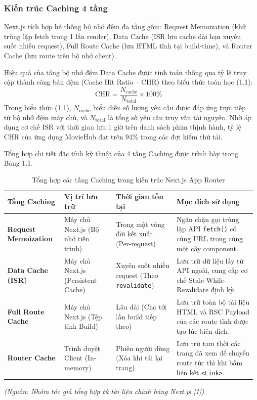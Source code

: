 \documentclass[13pt,a4paper]{extarticle}
\begin{document}
\subsubsection{Kiến trúc Caching 4 tầng}
Next.js tích hợp hệ thống bộ nhớ đệm đa tầng gồm: Request Memoization (khử trùng lặp fetch trong 1 lần render), Data Cache (ISR lưu cache dài hạn xuyên suốt nhiều request), Full Route Cache (lưu HTML tĩnh tại build-time), và Router Cache (lưu route trên bộ nhớ client).

Hiệu quả của tầng bộ nhớ đệm Data Cache được tính toán thông qua tỷ lệ truy cập thành công bản đệm (Cache Hit Ratio -- CHR) theo biểu thức toán học (1.1):
\begin{equation}
\text{CHR} = \frac{N_{\text{cache}}}{N_{\text{total}}} \times 100\%
\label{eq:chr}
\end{equation}
Trong biểu thức (1.1), $N_{\text{cache}}$ biểu diễn số lượng yêu cầu được đáp ứng trực tiếp từ bộ nhớ đệm máy chủ, và $N_{\text{total}}$ là tổng số yêu cầu truy vấn tài nguyên. Nhờ áp dụng cơ chế ISR với thời gian lưu 1 giờ trên danh sách phim thịnh hành, tỷ lệ CHR của ứng dụng MovieHub đạt trên 94\% trong các đợt kiểm thử tải.

Tổng hợp chi tiết đặc tính kỹ thuật của 4 tầng Caching được trình bày trong Bảng 1.1.

\begin{table}[H]
\centering
\caption{Tổng hợp các tầng Caching trong kiến trúc Next.js App Router}
\label{tab:caching}
\begin{tabularx}{\textwidth}{>{\raggedright\arraybackslash}p{3.2cm}>{\raggedright\arraybackslash}p{3cm}>{\raggedright\arraybackslash}p{3cm}>{\raggedright\arraybackslash}X}
\toprule
\textbf{Tầng Caching} & \textbf{Vị trí lưu trữ} & \textbf{Thời gian tồn tại} & \textbf{Mục đích sử dụng} \\
\midrule
\textbf{Request Memoization} & Máy chủ Next.js (Bộ nhớ tiến trình) & Trong một vòng đời kết xuất (Per-request) & Ngăn chặn gọi trùng lặp API \texttt{fetch()} có cùng URL trong cùng một cây component. \\
\midrule
\textbf{Data Cache (ISR)} & Máy chủ Next.js (Persistent Cache) & Xuyên suốt nhiều request (Theo \texttt{revalidate}) & Lưu trữ dữ liệu lấy từ API ngoài, cung cấp cơ chế Stale-While-Revalidate định kỳ. \\
\midrule
\textbf{Full Route Cache} & Máy chủ Next.js (Tệp tĩnh Build) & Lâu dài (Cho tới lần build tiếp theo) & Lưu trữ toàn bộ tài liệu HTML và RSC Payload của các route tĩnh được tạo lúc biên dịch. \\
\midrule
\textbf{Router Cache} & Trình duyệt Client (In-memory) & Phiên người dùng (Xóa khi tải lại trang) & Lưu trữ tạm thời các trang đã xem để chuyển route tức thì khi bấm liên kết \texttt{<Link>}. \\
\bottomrule
\end{tabularx}
\end{table}
\begin{flushleft}\small\textit{(Nguồn: Nhóm tác giả tổng hợp từ tài liệu chính hãng Next.js [1])}\end{flushleft}
\end{document}

